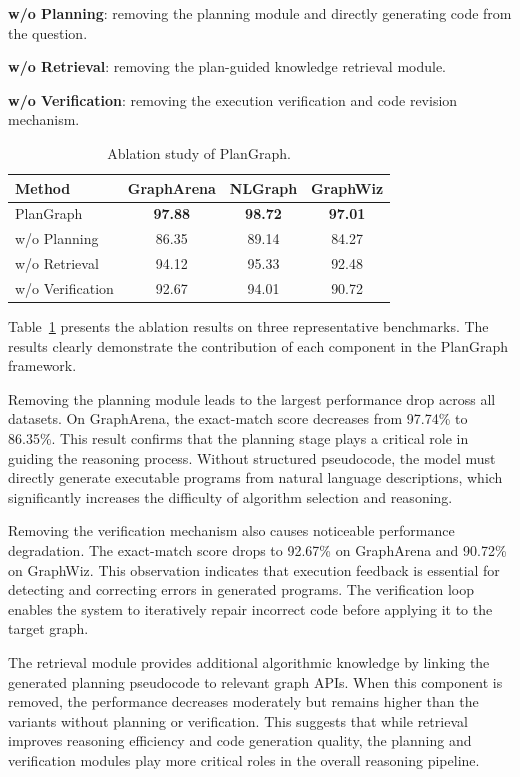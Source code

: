 \documentclass[sigconf,review,anonymous]{acmart}
\begin{document}
\textbf{w/o Planning}: removing the planning module and
directly generating code from the question.

\textbf{w/o Retrieval}: removing the plan-guided
knowledge retrieval module.

\textbf{w/o Verification}: removing the execution
verification and code revision mechanism.

\begin{table}[t]
\centering
\caption{Ablation study of PlanGraph.}
\label{tab:ablation}
\begin{tabular}{lccc}
\toprule
Method & GraphArena & NLGraph & GraphWiz \\
\midrule
PlanGraph & \textbf{97.88} & \textbf{98.72} & \textbf{97.01} \\
w/o Planning & 86.35 & 89.14 & 84.27 \\
w/o Retrieval & 94.12 & 95.33 & 92.48 \\
w/o Verification & 92.67 & 94.01 & 90.72 \\
\bottomrule
\end{tabular}
\end{table}

Table~\ref{tab:ablation} presents the ablation results on
three representative benchmarks. The results clearly
demonstrate the contribution of each component in the
PlanGraph framework.

Removing the planning module leads to the largest
performance drop across all datasets. On GraphArena,
the exact-match score decreases from 97.74\% to 86.35\%.
This result confirms that the planning stage plays a
critical role in guiding the reasoning process.
Without structured pseudocode, the model must directly
generate executable programs from natural language
descriptions, which significantly increases the
difficulty of algorithm selection and reasoning.

Removing the verification mechanism also causes
noticeable performance degradation. The exact-match score drops
to 92.67\% on GraphArena and 90.72\% on GraphWiz.
This observation indicates that execution feedback is
essential for detecting and correcting errors in
generated programs. The verification loop enables the
system to iteratively repair incorrect code before
applying it to the target graph.

The retrieval module provides additional algorithmic
knowledge by linking the generated planning pseudocode
to relevant graph APIs. When this component is removed,
the performance decreases moderately but remains higher
than the variants without planning or verification.
This suggests that while retrieval improves reasoning
efficiency and code generation quality, the planning
and verification modules play more critical roles in
the overall reasoning pipeline.
\end{document}
